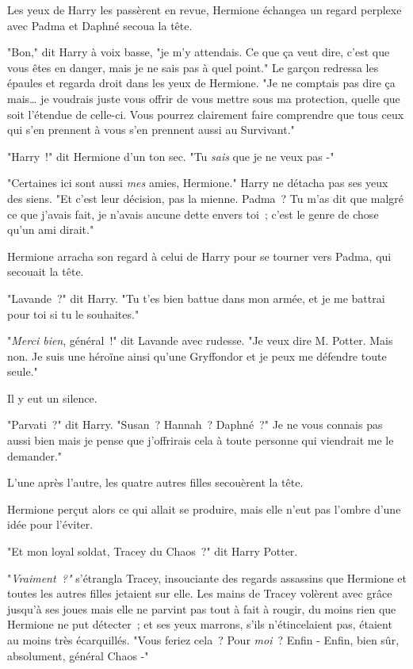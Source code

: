 Les yeux de Harry les passèrent en revue, Hermione échangea un regard perplexe avec Padma et Daphné secoua la tête.

"Bon," dit Harry à voix basse, "je m'y attendais. Ce que ça veut dire, c'est que vous êtes en danger, mais je ne sais pas à quel point." Le garçon redressa les épaules et regarda droit dans les yeux de Hermione. "Je ne comptais pas dire ça mais… je voudrais juste vous offrir de vous mettre sous ma protection, quelle que soit l'étendue de celle-ci. Vous pourrez clairement faire comprendre que tous ceux qui s'en prennent à vous s'en prennent aussi au Survivant."

"Harry~!" dit Hermione d'un ton sec. "Tu \emph{sais} que je ne veux pas -"

"Certaines ici sont aussi \emph{mes} amies, Hermione." Harry ne détacha pas ses yeux des siens. "Et c'est leur décision, pas la mienne. Padma~? Tu m'as dit que malgré ce que j'avais fait, je n'avais aucune dette envers toi~; c'est le genre de chose qu'un ami dirait."

Hermione arracha son regard à celui de Harry pour se tourner vers Padma, qui secouait la tête.

"Lavande~?" dit Harry. "Tu t'es bien battue dans mon armée, et je me battrai pour toi si tu le souhaites."

"\emph{Merci bien}, général~!" dit Lavande avec rudesse. "Je veux dire M. Potter. Mais non. Je suis une héroïne ainsi qu'une Gryffondor et je peux me défendre toute seule."

Il y eut un silence.

"Parvati~?" dit Harry. "Susan~? Hannah~? Daphné~?" Je ne vous connais pas aussi bien mais je pense que j'offrirais cela à toute personne qui viendrait me le demander."

L'une après l'autre, les quatre autres filles secouèrent la tête.

Hermione perçut alors ce qui allait se produire, mais elle n'eut pas l'ombre d'une idée pour l'éviter.

"Et mon loyal soldat, Tracey du Chaos~?" dit Harry Potter.

"\emph{Vraiment~?"} s'étrangla Tracey, insouciante des regards assassins que Hermione et toutes les autres filles jetaient sur elle. Les mains de Tracey volèrent avec grâce jusqu'à ses joues mais elle ne parvint pas tout à fait à rougir, du moins rien que Hermione ne put détecter~; et ses yeux marrons, s'ils n'étincelaient pas, étaient au moins très écarquillés. "Vous feriez cela~? Pour \emph{moi}~? Enfin - Enfin, bien sûr, absolument, général Chaos -"

